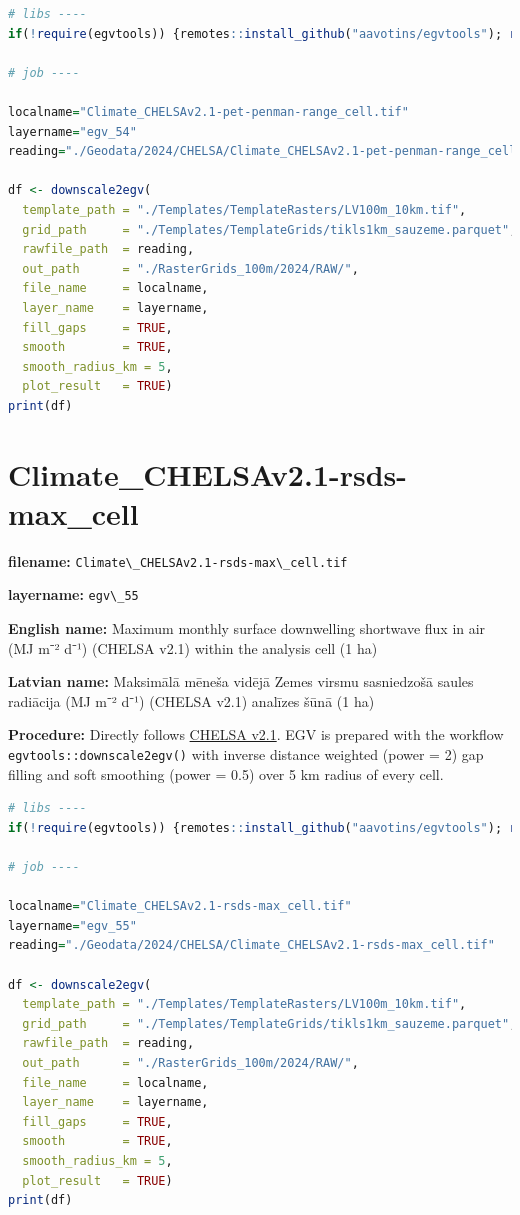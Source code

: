 \documentclass[
]{book}
\newcommand{\passthrough}[1]{#1}
\begin{document}
\begin{lstlisting}[language=R]
# libs ----
if(!require(egvtools)) {remotes::install_github("aavotins/egvtools"); require(egvtools)}

# job ----

localname="Climate_CHELSAv2.1-pet-penman-range_cell.tif"
layername="egv_54"
reading="./Geodata/2024/CHELSA/Climate_CHELSAv2.1-pet-penman-range_cell.tif"

df <- downscale2egv(
  template_path = "./Templates/TemplateRasters/LV100m_10km.tif",
  grid_path     = "./Templates/TemplateGrids/tikls1km_sauzeme.parquet",
  rawfile_path  = reading,
  out_path      = "./RasterGrids_100m/2024/RAW/",
  file_name     = localname,
  layer_name    = layername,
  fill_gaps     = TRUE,
  smooth        = TRUE,
  smooth_radius_km = 5,
  plot_result   = TRUE)
print(df)
\end{lstlisting}

\section{Climate\_CHELSAv2.1-rsds-max\_cell}\label{ch06.055}

\textbf{filename:} \passthrough{\lstinline!Climate\_CHELSAv2.1-rsds-max\_cell.tif!}

\textbf{layername:} \passthrough{\lstinline!egv\_55!}

\textbf{English name:} Maximum monthly surface downwelling shortwave flux in air (MJ m⁻² d⁻¹) (CHELSA v2.1) within the analysis cell (1 ha)

\textbf{Latvian name:} Maksimālā mēneša vidējā Zemes virsmu sasniedzošā saules radiācija (MJ m⁻² d⁻¹) (CHELSA v2.1) analīzes šūnā (1 ha)

\textbf{Procedure:} Directly follows \hyperref[Ch04.11]{CHELSA v2.1}. EGV is prepared with the
workflow \passthrough{\lstinline!egvtools::downscale2egv()!} with inverse distance weighted (power = 2)
gap filling and soft smoothing (power = 0.5) over 5 km radius of every cell.

\begin{lstlisting}[language=R]
# libs ----
if(!require(egvtools)) {remotes::install_github("aavotins/egvtools"); require(egvtools)}

# job ----

localname="Climate_CHELSAv2.1-rsds-max_cell.tif"
layername="egv_55"
reading="./Geodata/2024/CHELSA/Climate_CHELSAv2.1-rsds-max_cell.tif"

df <- downscale2egv(
  template_path = "./Templates/TemplateRasters/LV100m_10km.tif",
  grid_path     = "./Templates/TemplateGrids/tikls1km_sauzeme.parquet",
  rawfile_path  = reading,
  out_path      = "./RasterGrids_100m/2024/RAW/",
  file_name     = localname,
  layer_name    = layername,
  fill_gaps     = TRUE,
  smooth        = TRUE,
  smooth_radius_km = 5,
  plot_result   = TRUE)
print(df)
\end{lstlisting}
\end{document}

